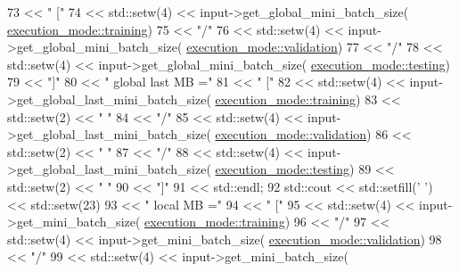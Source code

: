\begin{DoxyCode}
73               << \textcolor{stringliteral}{" ["}
74               << std::setw(4) << input->get\_global\_mini\_batch\_size(
      \hyperlink{base_8hpp_a2781a159088df64ed7d47cc91c4dc0a8ac185ddac8b5a8f5aa23c5b80bc12d214}{execution\_mode::training})
75               << \textcolor{stringliteral}{"/"}
76               << std::setw(4) << input->get\_global\_mini\_batch\_size(
      \hyperlink{base_8hpp_a2781a159088df64ed7d47cc91c4dc0a8aa617908b172c473cb8e8cda059e55bf0}{execution\_mode::validation})
77               << \textcolor{stringliteral}{"/"}
78               << std::setw(4) << input->get\_global\_mini\_batch\_size(
      \hyperlink{base_8hpp_a2781a159088df64ed7d47cc91c4dc0a8aae2b1fca515949e5d54fb22b8ed95575}{execution\_mode::testing})
79               << \textcolor{stringliteral}{"]"}
80               << \textcolor{stringliteral}{" global last MB ="}
81               << \textcolor{stringliteral}{" ["}
82               << std::setw(4) << input->get\_global\_last\_mini\_batch\_size(
      \hyperlink{base_8hpp_a2781a159088df64ed7d47cc91c4dc0a8ac185ddac8b5a8f5aa23c5b80bc12d214}{execution\_mode::training})
83               << std::setw(2) << \textcolor{stringliteral}{" "}
84               << \textcolor{stringliteral}{"/"}
85               << std::setw(4) << input->get\_global\_last\_mini\_batch\_size(
      \hyperlink{base_8hpp_a2781a159088df64ed7d47cc91c4dc0a8aa617908b172c473cb8e8cda059e55bf0}{execution\_mode::validation})
86               << std::setw(2) << \textcolor{stringliteral}{" "}
87               << \textcolor{stringliteral}{"/"}
88               << std::setw(4) << input->get\_global\_last\_mini\_batch\_size(
      \hyperlink{base_8hpp_a2781a159088df64ed7d47cc91c4dc0a8aae2b1fca515949e5d54fb22b8ed95575}{execution\_mode::testing})
89               << std::setw(2) << \textcolor{stringliteral}{" "}
90               << \textcolor{stringliteral}{"]"}
91               << std::endl;
92     std::cout << std::setfill(\textcolor{charliteral}{' '}) << std::setw(23)
93               << \textcolor{stringliteral}{"  local MB ="}
94               << \textcolor{stringliteral}{" ["}
95               << std::setw(4) << input->get\_mini\_batch\_size(
      \hyperlink{base_8hpp_a2781a159088df64ed7d47cc91c4dc0a8ac185ddac8b5a8f5aa23c5b80bc12d214}{execution\_mode::training})
96               << \textcolor{stringliteral}{"/"}
97               << std::setw(4) << input->get\_mini\_batch\_size(
      \hyperlink{base_8hpp_a2781a159088df64ed7d47cc91c4dc0a8aa617908b172c473cb8e8cda059e55bf0}{execution\_mode::validation})
98               << \textcolor{stringliteral}{"/"}
99               << std::setw(4) << input->get\_mini\_batch\_size(

\end{DoxyCode}

